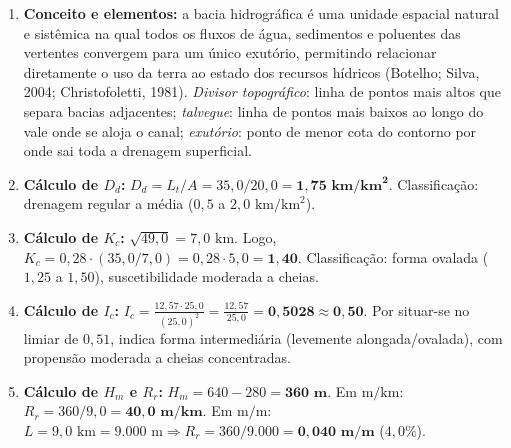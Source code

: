 \begin{boxGabarito}
\begin{enumerate}[leftmargin=1.8em, itemsep=3.5pt]
  \item \textbf{Conceito e elementos:} a bacia hidrográfica é uma unidade espacial natural e sistêmica na qual todos os fluxos de água, sedimentos e poluentes das vertentes convergem para um único exutório, permitindo relacionar diretamente o uso da terra ao estado dos recursos hídricos (Botelho; Silva, 2004; Christofoletti, 1981). \textit{Divisor topográfico}: linha de pontos mais altos que separa bacias adjacentes; \textit{talvegue}: linha de pontos mais baixos ao longo do vale onde se aloja o canal; \textit{exutório}: ponto de menor cota do contorno por onde sai toda a drenagem superficial.

  \item \textbf{Cálculo de $D_d$:} $D_d = L_t / A = 35{,}0 / 20{,}0 = \mathbf{1{,}75\text{ km}/\text{km}^2}$. Classificação: drenagem regular a média ($0{,}5$ a $2{,}0\text{ km}/\text{km}^2$).

  \item \textbf{Cálculo de $K_c$:} $\sqrt{49{,}0} = 7{,}0\text{ km}$. Logo, $K_c = 0{,}28 \cdot (35{,}0 / 7{,}0) = 0{,}28 \cdot 5{,}0 = \mathbf{1{,}40}$. Classificação: forma ovalada ($1{,}25$ a $1{,}50$), suscetibilidade moderada a cheias.

  \item \textbf{Cálculo de $I_c$:} $I_c = \frac{12{,}57 \cdot 25{,}0}{(25{,}0)^2} = \frac{12{,}57}{25{,}0} = \mathbf{0{,}5028 \approx 0{,}50}$. Por situar-se no limiar de $0{,}51$, indica forma intermediária (levemente alongada/ovalada), com propensão moderada a cheias concentradas.

  \item \textbf{Cálculo de $H_m$ e $R_r$:} $H_m = 640 - 280 = \mathbf{360\text{ m}}$. Em $\text{m}/\text{km}$: $R_r = 360 / 9{,}0 = \mathbf{40{,}0\text{ m}/\text{km}}$. Em $\text{m}/\text{m}$: $L = 9{,}0\text{ km} = 9.000\text{ m} \Rightarrow R_r = 360 / 9.000 = \mathbf{0{,}040\text{ m}/\text{m}}$ ($4{,}0\%$).


\end{enumerate}
\end{boxGabarito}
